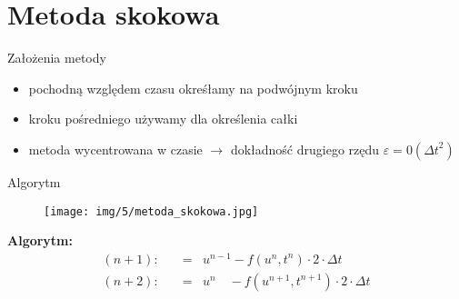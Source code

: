 \section{Metoda skokowa}
\begin{frame}{Założenia metody}
	\begin{itemize}
	\item pochodną względem czasu okreśłamy na podwójnym kroku
    \item kroku pośredniego używamy dla określenia całki
    \item metoda wycentrowana w czasie $\rightarrow $ dokładność drugiego rzędu $\varepsilon = 0({\Delta t}^2)$
	\end{itemize}
\end{frame}
\begin{frame}{Algorytm}
	\begin{figure}
	\texttt{[image: img/5/metoda\_skokowa.jpg]}
	\end{figure}
    \textbf{Algorytm:}
    $$ \begin{array}{rcl}
      (n+1):\quad &=&u^{n-1} -f(u^n,t^n)\cdot 2 \cdot \Delta t\\
      (n+2):\quad &=&u^n \quad -f(u^{n+1},t^{n+1})\cdot 2 \cdot \Delta t
      \end{array} $$
    
\end{frame}


